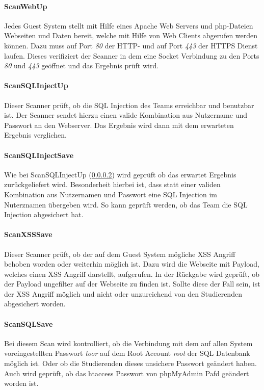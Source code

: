 \paragraph{ScanWebUp}\label{para:ScanWebUp}
Jedes Guest System stellt mit Hilfe eines Apache Web Servers und php-Dateien Webseiten und Daten bereit, welche mit Hilfe von Web Clients abgerufen werden können. Dazu muss auf Port \textit{80} der HTTP- und auf Port \textit{443} der HTTPS Dienst laufen. Dieses verifiziert der Scanner in dem eine Socket Verbindung zu den Ports \textit{80} und \textit{443} geöffnet und das Ergebnis prüft wird.

\paragraph{ScanSQLInjectUp}\label{para:ScanSQLInjectUp}
Dieser Scanner prüft, ob die SQL Injection des Teams erreichbar und benutzbar ist. Der Scanner sendet hierzu einen valide Kombination aus Nutzername und Passwort an den Webserver. Das Ergebnis wird dann mit dem erwarteten Ergebnis verglichen.

\paragraph{ScanSQLInjectSave}\label{para:ScanSQLInjectSave}
Wie bei ScanSQLInjectUp (\ref{para:ScanSQLInjectUp}) wird geprüft ob das erwartet Ergebnis zurückgeliefert wird. Besonderheit hierbei ist, dass statt einer validen Kombination aus Nutzernamen und Passwort eine SQL Injection im Nuterznamen übergeben wird. So kann geprüft werden, ob das Team die SQL Injection abgesichert hat.

\paragraph{ScanXSSSave}\label{para:ScanXSSSave}
Dieser Scanner prüft, ob der auf dem Guest System mögliche XSS Angriff behoben worden oder weiterhin möglich ist. Dazu wird die Webseite mit Payload, welches einen XSS Angriff darstellt, aufgerufen. In der Rückgabe wird geprüft, ob der Payload ungefilter auf der Webseite zu finden ist. Sollte diese der Fall sein, ist der XSS Angriff möglich und nicht oder unzureichend von den Studierenden abgesichert worden.

\paragraph{ScanSQLSave}\label{para:ScanSQLSave}
Bei diesem Scan wird kontrolliert, ob die Verbindung mit dem auf allen System voreingestellten Passwort \textit{toor} auf dem Root Account \textit{root} der SQL Datenbank möglich ist. Oder ob die Studierenden dieses unsichere Passwort geändert haben. Auch wird geprüft, ob das htaccess Passwort von phpMyAdmin Pafd geändert worden ist.

